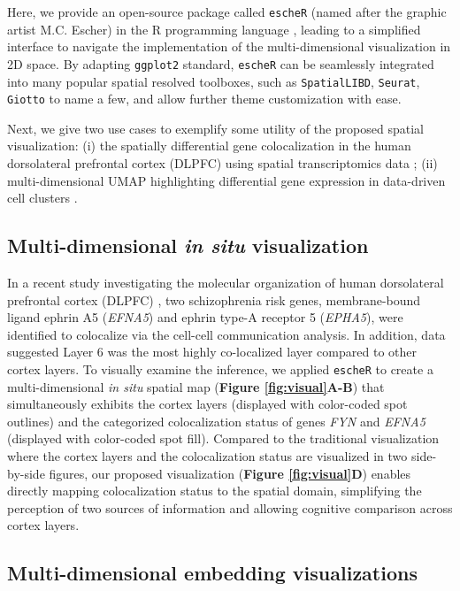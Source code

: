 \documentclass[10pt,twocolumn]{article}
\begin{document}
Here, we provide an open-source package called \texttt{escheR} (named after the graphic artist M.C. Escher) in the R programming language \cite{R}, leading to a simplified interface to navigate the implementation of the multi-dimensional visualization in 2D space. By adapting \texttt{ggplot2} standard, \texttt{escheR} can be seamlessly integrated into many popular spatial resolved toolboxes, such as \texttt{SpatialLIBD}\cite{pardo_2022}, \texttt{Seurat}\cite{hao_2021}, \texttt{Giotto}\cite{dries_2021} to name a few, and allow further theme customization with ease.

Next, we give two use cases to exemplify some utility of the proposed spatial visualization: (i) the spatially differential gene colocalization in the human dorsolateral prefrontal cortex (DLPFC) using spatial transcriptomics data \cite{huukimyers_2023}; (ii) multi-dimensional UMAP highlighting differential gene expression in data-driven cell clusters \cite{freytag_2020}. 



\subsection{Multi-dimensional \textit{in situ} visualization}
In a recent study investigating the molecular organization of human dorsolateral prefrontal cortex (DLPFC) \cite{huukimyers_2023}, two schizophrenia risk genes, membrane-bound ligand ephrin A5 (\textit{EFNA5}) and ephrin type-A receptor 5 (\textit{EPHA5}), were identified to colocalize via the cell-cell communication analysis. In addition, data suggested Layer 6 was the most highly co-localized layer compared to other cortex layers. To visually examine the inference, we applied \texttt{escheR} to create a multi-dimensional \textit{in situ} spatial map (\textbf{Figure \ref{fig:visual}A-B}) that simultaneously exhibits the cortex layers (displayed with color-coded spot outlines) and the categorized colocalization status of genes \textit{FYN} and \textit{EFNA5} (displayed with color-coded spot fill). Compared to the traditional visualization where the cortex layers and the colocalization status are visualized in two side-by-side figures, our proposed visualization (\textbf{Figure \ref{fig:visual}D}) enables directly mapping colocalization status to the spatial domain, simplifying the perception of two sources of information and allowing cognitive comparison across cortex layers. 

\subsection{Multi-dimensional embedding visualizations}
\end{document}

